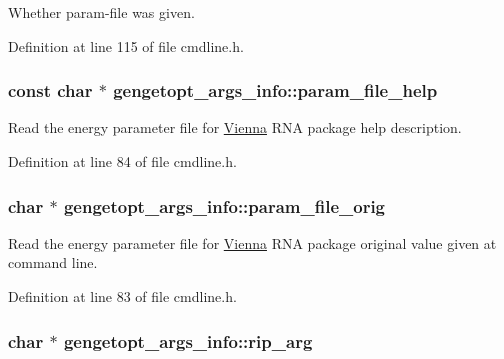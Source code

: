 Whether param-\/file was given. 



Definition at line 115 of file cmdline.\+h.

\hypertarget{structgengetopt__args__info_a9f45df949ae710b164262b66c4982498}{
\subsubsection[{param\+\_\+file\+\_\+help}]{\setlength{\rightskip}{0pt plus 5cm}const char $\ast$ gengetopt\+\_\+args\+\_\+info\+::param\+\_\+file\+\_\+help}}\label{structgengetopt__args__info_a9f45df949ae710b164262b66c4982498}


Read the energy parameter file for \hyperlink{namespace_vienna}{Vienna} R\+N\+A package help description. 



Definition at line 84 of file cmdline.\+h.

\hypertarget{structgengetopt__args__info_af063ce92f6e760b3edfd61e488221afb}{
\subsubsection[{param\+\_\+file\+\_\+orig}]{\setlength{\rightskip}{0pt plus 5cm}char $\ast$ gengetopt\+\_\+args\+\_\+info\+::param\+\_\+file\+\_\+orig}}\label{structgengetopt__args__info_af063ce92f6e760b3edfd61e488221afb}


Read the energy parameter file for \hyperlink{namespace_vienna}{Vienna} R\+N\+A package original value given at command line. 



Definition at line 83 of file cmdline.\+h.

\hypertarget{structgengetopt__args__info_aa613330dba372001de2dfa178b161a1a}{
\subsubsection[{rip\+\_\+arg}]{\setlength{\rightskip}{0pt plus 5cm}char $\ast$ gengetopt\+\_\+args\+\_\+info\+::rip\+\_\+arg}}\label{structgengetopt__args__info_aa613330dba372001de2dfa178b161a1a}


